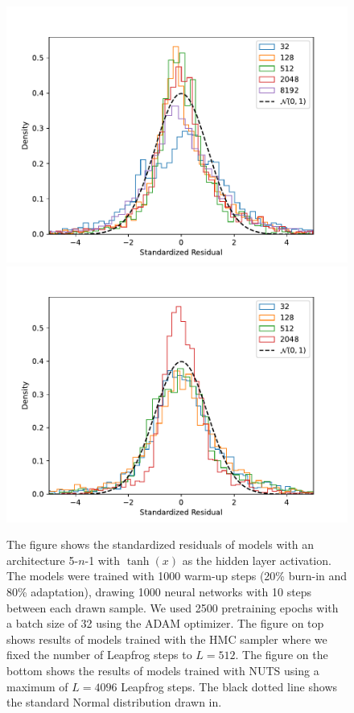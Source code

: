 \begin{figure}[H]
    \centering
    \includegraphics[scale=0.7]{figures/standardized_residuals/effect_of_num_params/standardized_residual_HMC.pdf}
    \includegraphics[scale=0.7]{figures/standardized_residuals/effect_of_num_params/standardized_residual_NUTS.pdf}
    \caption{
        The figure shows the standardized residuals of models with an architecture 5-$n$-1 with $\tanh(x)$ as the hidden layer activation. The models were trained with 1000 warm-up steps (20\% burn-in and 80\% adaptation), drawing 1000 neural networks with 10 steps between each drawn sample. We used 2500 pretraining epochs with a batch size of 32 using the ADAM optimizer. The figure on top shows results of models trained with the HMC sampler where we fixed the number of Leapfrog steps to $L = 512$. The figure on the bottom shows the results of models trained with NUTS using a maximum of $L = 4096$ Leapfrog steps. The black dotted line shows the standard Normal distribution drawn in.
    }
    \label{fig:standardized_residual_vs_params}
\end{figure}

